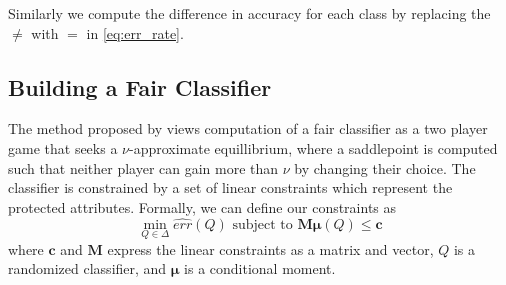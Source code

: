 Similarly we compute the difference in accuracy for each class by replacing the $\neq$ with $=$ in \autoref{eq:err_rate}.

\subsection{Building a Fair Classifier}
The method proposed by \cite{Agarwal:2018} views computation of a fair classifier as a two player game that seeks a $\nu$-approximate equillibrium, where a saddlepoint is computed such that neither player can gain more than $\nu$ by changing their choice. The classifier is constrained by a set of linear constraints which represent the protected attributes. Formally, we can define our constraints as
\begin{equation}
  \min_{Q\in\Delta} \widehat{err}(Q) \text{ subject to } \bm{M\mu}(Q) \leq \mathbf{c}
  \label{eq:constraint}
\end{equation}
where $\mathbf{c}$ and $\mathbf{M}$ express the linear constraints as a matrix and vector, $Q$ is a randomized classifier, and $\bm{\mu}$ is a conditional moment.\vspace{5mm}




